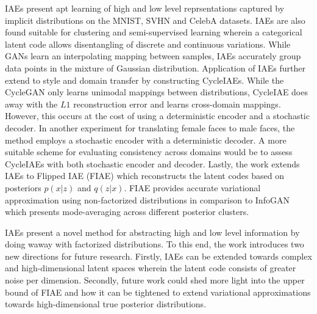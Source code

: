 \documentclass[11pt,letterpaper]{article}
\begin{document}
IAEs present apt learning of high and low level reprsentations captured by implicit distributions on the MNIST, SVHN and CelebA datasets. IAEs are also found suitable for clustering and semi-supervised learning wherein a categorical latent code allows disentangling of discrete and continuous variations. While GANs learn an interpolating mapping between samples, IAEs accurately group data points in the mixture of Gaussian distribution. Application of IAEs further extend to style and domain transfer by constructing CycleIAEs. While the CycleGAN only learns unimodal mappings between distributions, CycleIAE does away with the $L1$ reconstruction error and learns cross-domain mappings. However, this occurs at the cost of using a deterministic encoder and a stochastic decoder. In another experiment for translating female faces to male faces, the method employs a stochastic encoder with a deterministic decoder. A more suitable scheme for evaluating consistency across domains would be to assess CycleIAEs with both stochastic encoder and decoder. Lastly, the work extends IAEs to Flipped IAE (FIAE) which reconstructs the latent codes based on posteriors $p(x|z)$ and $q(z|x)$. FIAE provides accurate variational approximation using non-factorized distributions in comparison to InfoGAN which presents mode-averaging across different posterior clusters. 

IAEs present a novel method for abstracting high and low level information by doing waway with factorized distributions. To this end, the work introduces two new directions for future research. Firstly, IAEs can be extended towards complex and high-dimensional latent spaces wherein the latent code consists of greater noise per dimension. Secondly, future work could shed more light into the upper bound of FIAE and how it can be tightened to extend variational approximations towards high-dimensional true posterior distributions. 
\end{document}
